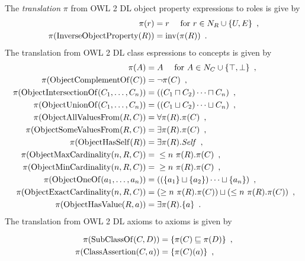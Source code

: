 \begin{definition} \label{def:owl2sroiq}
  The \emph{translation} $\pi$ from OWL 2 DL object property expressions to \SROIQ roles is give by
  \begin{align*}
    \pi(r) &= r \quad \text{ for } r \in N_R \cup \{ U, E \} \enspace, \\
    \pi(\operatorname{InverseObjectProperty}(R)) &= \operatorname{inv}(\pi(R)) \enspace.
  \end{align*}
  The translation from OWL 2 DL class espressions to \SROIQ concepts is given by
  \begin{align*}
    \pi(A) &= A \quad \text{ for } A \in N_C \cup \{ \top, \bot \} \enspace, \\
    \pi(\operatorname{ObjectComplementOf}(C)) &= \lnot \pi(C) \enspace, \\
    \pi(\operatorname{ObjectIntersectionOf}(C_1, \dots, C_n)) &= ((C_1 \sqcap C_2) \cdots \sqcap C_n) \enspace, \\
    \pi(\operatorname{ObjectUnionOf}(C_1, \dots, C_n)) &= ((C_1 \sqcup C_2) \cdots \sqcup C_n) \enspace, \\
    \pi(\operatorname{ObjectAllValuesFrom}(R, C)) &= \forall \pi(R).\pi(C) \enspace, \\
    \pi(\operatorname{ObjectSomeValuesFrom}(R, C)) &= \exists \pi(R).\pi(C) \enspace, \\
    \pi(\operatorname{ObjectHasSelf}(R)) &= \exists \pi(R).\mathit{Self} \enspace, \\
    \pi(\operatorname{ObjectMaxCardinality}(n, R, C)) &={} \leq n~\pi(R).\pi(C) \enspace, \\
    \pi(\operatorname{ObjectMinCardinality}(n, R, C)) &={} \geq n~\pi(R).\pi(C) \enspace, \\
    \pi(\operatorname{ObjectOneOf}(a_1, \dots, a_n)) &= ((\{a_1\} \sqcup \{a_2\}) \cdots \sqcup \{a_n\}) \enspace, \\
    \pi(\operatorname{ObjectExactCardinality}(n, R, C)) &= (\geq n~\pi(R).\pi(C)) \sqcup (\leq n~\pi(R).\pi(C)) \enspace, \\
    \pi(\operatorname{ObjectHasValue}(R, a)) &= \exists \pi(R).\{a\} \enspace.
  \end{align*}
  The translation from OWL 2 DL axioms to \SROIQ axioms is given by
  \begin{widepage}
    \small
    \begin{align*}
      \pi(\op{SubClassOf}(C, D)) ={} & \{ \pi(C) \sqsubseteq \pi(D) \} \enspace, \\
      \pi(\op{ClassAssertion}(C, a)) ={} & \{ \pi(C)(a) \} \enspace, \\

\end{align*}
\end{widepage}
\end{definition}
